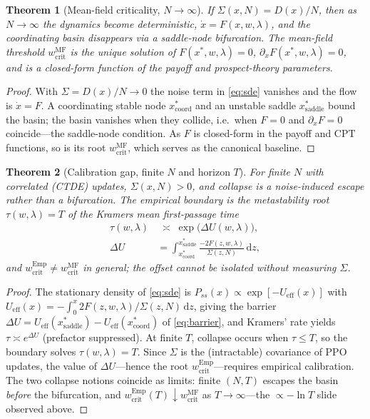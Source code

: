 \documentclass[letterpaper]{article}
\theoremstyle{plain}
\newtheorem{theorem}{Theorem}
\begin{document}
\begin{theorem}[Mean-field criticality, $N\to\infty$]\label{thm:mf}
If $\Sigma(x,N)=D(x)/N$, then as $N\to\infty$ the dynamics become deterministic,
$\dot x=F(x,w,\lambda)$, and the coordinating basin disappears via a saddle-node
bifurcation. The mean-field threshold $w_{\mathrm{crit}}^{\mathrm{MF}}$ is the
unique solution of $F(x^\ast,w,\lambda)=0$, $\partial_x F(x^\ast,w,\lambda)=0$,
and is a closed-form function of the payoff and prospect-theory parameters.
\end{theorem}
\begin{proof}
With $\Sigma=D(x)/N\to0$ the noise term in \eqref{eq:sde} vanishes and the flow
is $\dot x=F$. A coordinating stable node $x^\ast_{\mathrm{coord}}$ and an
unstable saddle $x^\ast_{\mathrm{saddle}}$ bound the basin; the basin vanishes
when they collide, i.e.\ when $F=0$ and $\partial_x F=0$ coincide---the
saddle-node condition. As $F$ is closed-form in the payoff and CPT functions, so
is its root $w_{\mathrm{crit}}^{\mathrm{MF}}$, which serves as the canonical
baseline.
\end{proof}

\begin{theorem}[Calibration gap, finite $N$ and horizon $T$]\label{thm:gap}
For finite $N$ with correlated (CTDE) updates, $\Sigma(x,N)>0$, and collapse is a
noise-induced escape rather than a bifurcation. The empirical boundary is the
metastability root $\tau(w,\lambda)=T$ of the Kramers mean first-passage time
\begin{equation}
\begin{aligned}
  \tau(w,\lambda)&\;\asymp\;\exp\!\big(\Delta U(w,\lambda)\big),\\
  \Delta U&=\int_{x^\ast_{\mathrm{coord}}}^{x^\ast_{\mathrm{saddle}}}
    \frac{-2F(z,w,\lambda)}{\Sigma(z,N)}\,\mathrm{d}z,
\end{aligned}
  \label{eq:barrier}
\end{equation}
and $w_{\mathrm{crit}}^{\mathrm{Emp}}\neq w_{\mathrm{crit}}^{\mathrm{MF}}$ in
general; the offset cannot be isolated without measuring $\Sigma$.
\end{theorem}
\begin{proof}
The stationary density of \eqref{eq:sde} is
$P_{ss}(x)\propto\exp[-U_{\mathrm{eff}}(x)]$ with
$U_{\mathrm{eff}}(x)=-\!\int_0^x 2F(z,w,\lambda)/\Sigma(z,N)\,\mathrm{d}z$, giving
the barrier $\Delta U=U_{\mathrm{eff}}(x^\ast_{\mathrm{saddle}})
-U_{\mathrm{eff}}(x^\ast_{\mathrm{coord}})$ of \eqref{eq:barrier}, and Kramers'
rate yields $\tau\asymp e^{\Delta U}$ (prefactor suppressed). At finite $T$,
collapse occurs when $\tau\le T$, so the boundary solves
$\tau(w,\lambda)=T$. Since $\Sigma$ is the (intractable) covariance of PPO
updates, the value of $\Delta U$---hence the root
$w_{\mathrm{crit}}^{\mathrm{Emp}}$---requires empirical calibration. The two
collapse notions coincide as limits:
finite $(N,T)$ escapes the basin \emph{before} the  bifurcation, and
$w_{\mathrm{crit}}^{\mathrm{Emp}}(T)\!\downarrow\!w_{\mathrm{crit}}^{\mathrm{MF}}$
as $T\to\infty$---the $\propto-\ln T$ slide observed above.
\end{proof}
\end{document}
